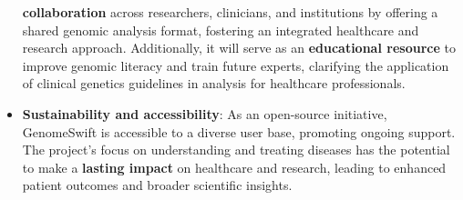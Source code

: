 \begin{itemize}
\textbf{collaboration} across researchers, clinicians, and institutions
by offering a shared genomic analysis format, fostering an integrated
healthcare and research approach. Additionally, it will serve as an
\textbf{educational resource} to improve genomic literacy and train
future experts, clarifying the application of clinical genetics
guidelines in analysis for healthcare professionals.
\item \textbf{Sustainability and accessibility}: As an open-source
initiative, GenomeSwift is accessible to a diverse user base, promoting
ongoing support. The project's focus on understanding
and treating diseases has the potential to make a \textbf{lasting
impact} on healthcare and research, leading to enhanced patient outcomes and broader scientific insights.

\end{itemize}
